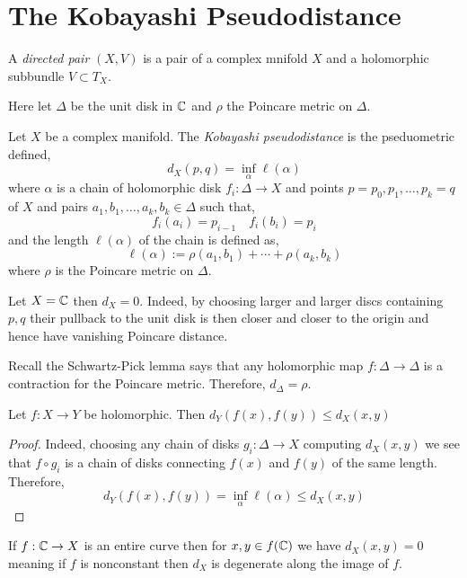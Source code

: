 \documentclass[12pt]{article}
\begin{document}
\section{The Kobayashi Pseudodistance}

\begin{defn}
A \textit{directed pair} $(X, V)$ is a pair of a complex mnifold $X$ and a holomorphic subbundle $V \subset T_X$. 
\end{defn}

Here let $\Delta$ be the unit disk in $\mathbb{C}$ and $\rho$ the Poincare metric on $\Delta$.

\begin{defn}
Let $X$ be a complex manifold. The \textit{Kobayashi pseudodistance} is the pseduometric defined,
\[ d_X(p,q) = \inf_\alpha \ell(\alpha) \]
where $\alpha$ is a chain of holomorphic disk $f_i : \Delta \to X$ and points $p = p_0, p_1, \dots, p_k = q$ of $X$ and pairs $a_1, b_1, \dots, a_k, b_k \in \Delta$ such that,
\[ f_i(a_i) = p_{i-1} \quad f_i(b_i) = p_i \]
and the length $\ell(\alpha)$ of the chain is defined as,
\[ \ell(\alpha) := \rho(a_1, b_1) + \cdots + \rho(a_k, b_k) \]
where $\rho$ is the Poincare metric on $\Delta$.
\end{defn}

\begin{example}
Let $X = \mathbb{C}$ then $d_X = 0$. Indeed, by choosing larger and larger discs containing $p,q$ their pullback to the unit disk is then closer and closer to the origin and hence have vanishing Poincare distance.  
\end{example}

\begin{rmk}
Recall the Schwartz-Pick lemma says that any holomorphic map $f : \Delta \to \Delta$ is a contraction for the Poincare metric. Therefore, $d_{\Delta} = \rho$.
\end{rmk}

\begin{lemma}
Let $f : X \to Y$ be holomorphic. Then $d_Y(f(x), f(y)) \le d_X(x,y)$ 
\end{lemma}

\begin{proof}
Indeed, choosing any chain of disks $g_i : \Delta \to X$ computing $d_X(x,y)$ we see that $f \circ g_i$ is a chain of disks connecting $f(x)$ and $f(y)$ of the same length. Therefore,
\[ d_Y(f(x), f(y)) = \inf_{\alpha} \ell(\alpha) \le d_X(x, y) \] 
\end{proof}

\begin{cor}
If $f : \mathbb{C} \to X$ is an entire curve then for $x, y \in f(\mathbb{C})$ we have $d_X(x,y) = 0$ meaning if $f$ is nonconstant then $d_X$ is degenerate along the image of $f$. 
\end{cor}
\end{document}

